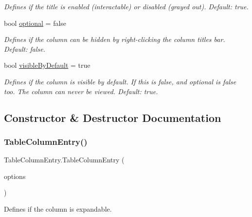 \begin{DoxyCompactItemize}
\begin{DoxyCompactList}\small\item\em Defines if the title is enabled (interactable) or disabled (grayed out). Default\+: true. \end{DoxyCompactList}\item 
bool \mbox{\hyperlink{class_table_column_entry_a475870b7af204554a3ee617cc68886e1}{optional}} = false
\begin{DoxyCompactList}\small\item\em Defines if the column can be hidden by right-\/clicking the column titles bar. Default\+: false. \end{DoxyCompactList}\item 
bool \mbox{\hyperlink{class_table_column_entry_a4271193e2502ef06798966773677d3a8}{visible\+By\+Default}} = true
\begin{DoxyCompactList}\small\item\em Defines if the column is visible by default. If this is false, and optional is false too. The column can never be viewed. Default\+: true. \end{DoxyCompactList}\end{DoxyCompactItemize}


\subsection{Constructor \& Destructor Documentation}
\mbox{\label{class_table_column_entry_af655798cdcaa427f57b1065e54afbc71}} 
\subsubsection{\texorpdfstring{Table\+Column\+Entry()}{TableColumnEntry()}}
{\footnotesize\ttfamily Table\+Column\+Entry.\+Table\+Column\+Entry (\begin{DoxyParamCaption}\item[{\mbox{\hyperlink{class_table_column_option}{Table\+Column\+Option}} \mbox{[}$\,$\mbox{]}}]{options }\end{DoxyParamCaption})\hspace{0.3cm}{\ttfamily [inline]}}



Defines if the column is expandable. 



